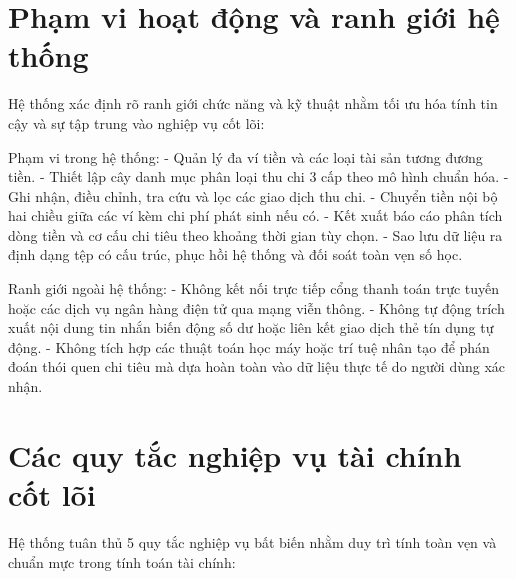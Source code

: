 \documentclass[a4paper,12pt]{report}
\begin{document}
\section{Phạm vi hoạt động và ranh giới hệ
thống}\label{phux1ea1m-vi-houx1ea1t-ux111ux1ed9ng-vuxe0-ranh-giux1edbi-hux1ec7-thux1ed1ng}

Hệ thống xác định rõ ranh giới chức năng và kỹ thuật nhằm tối ưu hóa
tính tin cậy và sự tập trung vào nghiệp vụ cốt lõi:

Phạm vi trong hệ thống: - Quản lý đa ví tiền và các loại tài sản tương
đương tiền. - Thiết lập cây danh mục phân loại thu chi 3 cấp theo mô
hình chuẩn hóa. - Ghi nhận, điều chỉnh, tra cứu và lọc các giao dịch thu
chi. - Chuyển tiền nội bộ hai chiều giữa các ví kèm chi phí phát sinh
nếu có. - Kết xuất báo cáo phân tích dòng tiền và cơ cấu chi tiêu theo
khoảng thời gian tùy chọn. - Sao lưu dữ liệu ra định dạng tệp có cấu
trúc, phục hồi hệ thống và đối soát toàn vẹn số học.

Ranh giới ngoài hệ thống: - Không kết nối trực tiếp cổng thanh toán trực
tuyến hoặc các dịch vụ ngân hàng điện tử qua mạng viễn thông. - Không tự
động trích xuất nội dung tin nhắn biến động số dư hoặc liên kết giao
dịch thẻ tín dụng tự động. - Không tích hợp các thuật toán học máy hoặc
trí tuệ nhân tạo để phán đoán thói quen chi tiêu mà dựa hoàn toàn vào dữ
liệu thực tế do người dùng xác nhận.

\section{Các quy tắc nghiệp vụ tài chính cốt
lõi}\label{cuxe1c-quy-tux1eafc-nghiux1ec7p-vux1ee5-tuxe0i-chuxednh-cux1ed1t-luxf5i}

Hệ thống tuân thủ 5 quy tắc nghiệp vụ bất biến nhằm duy trì tính toàn
vẹn và chuẩn mực trong tính toán tài chính:
\end{document}
